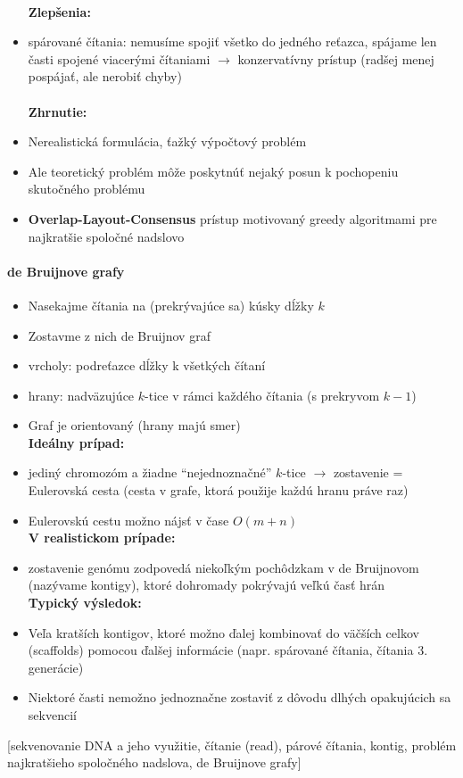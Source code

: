 \begin{itemize}
					\\\textbf{Zlepšenia:}
						\item spárované čítania:  nemusíme spojiť všetko do jedného reťazca, spájame len časti spojené viacerými čítaniami $\rightarrow$ konzervatívny prístup (radšej menej pospájať, ale nerobiť chyby)\\
					\\\textbf{Zhrnutie:} 
						\item Nerealistická formulácia, ťažký výpočtový problém
						\item Ale teoretický problém môže poskytnúť nejaký posun k pochopeniu skutočného problému
						\item \textbf{Overlap-Layout-Consensus} prístup motivovaný greedy algoritmami pre najkratšie spoločné nadslovo
				\end{itemize}
			\paragraph{de Bruijnove grafy}
				\begin{itemize}
						\item Nasekajme čítania na (prekrývajúce sa) kúsky dĺžky $k$
						\item Zostavme z nich de Bruijnov graf
						\item vrcholy: podreťazce dĺžky k všetkých čítaní
						\item hrany: nadväzujúce $k$-tice v rámci každého čítania (s prekryvom $k - 1$)
						\item Graf je orientovaný (hrany majú smer)
					\\\textbf{Ideálny prípad:}
						\item jediný chromozóm a žiadne “nejednoznačné” $k$-tice $\rightarrow$ zostavenie = Eulerovská cesta (cesta v grafe, ktorá použije každú hranu práve raz)
						\item Eulerovskú cestu možno nájsť v čase $O(m + n)$
					\\\textbf{V realistickom prípade:}
						\item zostavenie genómu zodpovedá niekoľkým pochôdzkam v de Bruijnovom (nazývame kontigy), ktoré dohromady pokrývajú veľkú časť hrán
					\\\textbf{Typický výsledok: }
						\item Veľa kratších kontigov, ktoré možno ďalej kombinovať do väčších celkov (scaffolds) pomocou ďalšej informácie (napr. spárované čítania, čítania 3. generácie)
						\item Niektoré časti nemožno jednoznačne zostaviť z dôvodu dlhých opakujúcich sa sekvencií
				\end{itemize}
	[sekvenovanie DNA a jeho využitie, čítanie (read), párové čítania, kontig, problém najkratšieho spoločného nadslova, de Bruijnove grafy]

